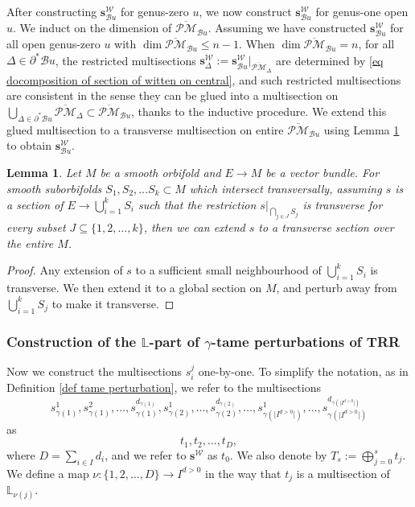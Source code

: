 \documentclass[11pt]{amsart}
\newtheorem{lem}[dummy]{Lemma}
\theoremstyle{definition}
\theoremstyle{remark}
\newcommand{\oPMb}{{\overline{\mathcal{PM}}}}
\newcommand{\<}{\left<}
\renewcommand{\>}{\right>}
\numberwithin{equation}{section}
\begin{document}
After constructing $\bm{s}^{\mathcal W}_{\mathcal B u}$ for genus-zero $u$, we now construct $\bm{s}^{\mathcal W}_{\mathcal B u}$ for genus-one open $u$. We induct on the dimension of $\oPMb_{\mathcal B u}$. Assuming we have constructed $\bm{s}^{\mathcal W}_{\mathcal B u}$ for all open genus-zero $u$ with $\dim \oPMb_{\mathcal B u}\le n-1$. When $\dim \oPMb_{\mathcal B u} = n$, for all $\Delta \in \partial^* \mathcal B u$, the restricted multisections $\bm{s}^{\mathcal W}_{\Delta}:=\bm{s}^{\mathcal W}_{\mathcal B u}\vert_{\oPMb_\Delta}$ are determined by \eqref{eq docomposition of section of witten on central}, and such restricted multisections are consistent in the sense they can be glued into a multisection on $\bigcup_{\Delta\in \partial^* \mathcal B u}\oPMb_\Delta \subset \oPMb_{\mathcal B u}$, thanks to the inductive procedure. We extend this glued multisection to a transverse multisection on entire $\oPMb_{\mathcal B u}$ using Lemma \ref{lem extend section from sub} to obtain $\bm{s}^{\mathcal W}_{\mathcal B u}$. 


\begin{lem}\label{lem extend section from sub}
    Let $M$ be a smooth orbifold and $E\to M$ be a vector bundle. For smooth suborbifolds $S_1,S_2,\dots S_k\subset M$ which intersect transversally, assuming $s$ is a section of $E\to \bigcup_{i=1}^k S_i$ such that the restriction $s\vert_{\bigcap_{j\in J}S_j}$ is transverse for every subset $J\subseteq \{1,2,\dots,k\}$, then we can extend $s$ to a transverse section over the entire $M$. 
\end{lem}
\begin{proof}
    Any extension of $s$ to a sufficient small neighbourhood of $\bigcup_{i=1}^k S_i$ is transverse. We then extend it to a global section on $M$, and perturb away from $\bigcup_{i=1}^k S_j$ to make it transverse.
\end{proof}




\subsubsection{Construction of the $\mathbb L$-part of $\gamma$-tame perturbations of TRR} \label{sec construction of tame L part}
Now we construct the multisections $s_i^j$ one-by-one. To simplify the notation, as in Definition \ref{def tame perturbation}, we refer to the multisections 
$$s_{\gamma(1)}^1, s_{\gamma(1)}^2, \dots, s_{\gamma(1)}^{d_{\gamma(1)}}, s_{\gamma(2)}^1, \dots, s_{\gamma(2)}^{d_{\gamma(2)}}, \dots, s_{\gamma(\lvert I^{d>0}\rvert)}^1, \dots, s_{\gamma(\lvert I^{d>0}\rvert)}^{d_{\gamma(\lvert I^{d>0}\rvert)}}$$
as 
$$t_1,t_2,\dots,t_{D},$$
where $D=\sum_{i\in I} d_i$, and we refer to $\bm{s}^{\mathcal W}$ as $t_0$. We also denote by 
$T_s:=\bigoplus_{j=0}^s t_j.$
We define a map $\nu \colon \{1,2,\dots, D\} \to  I^{d>0}$ in the way that $t_j$ is a multisection of $\mathbb L_{\nu(j)}$.
\end{document}
